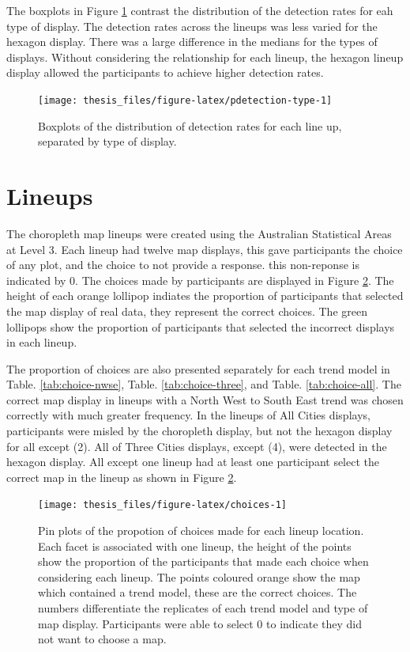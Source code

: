 \documentclass{monashthesis}
\begin{document}
The boxplots in Figure \ref{fig:pdetection-type} contrast the distribution of the detection rates for eah type of display.
The detection rates across the lineups was less varied for the hexagon display. There was a large difference in the medians for the types of displays.
Without considering the relationship for each lineup, the hexagon lineup display allowed the participants to achieve higher detection rates.

\begin{figure}

{\centering \texttt{[image: thesis\_files/figure-latex/pdetection-type-1]} 

}

\caption{Boxplots of the distribution of detection rates for each line up, separated by type of display.}\label{fig:pdetection-type}
\end{figure}

\hypertarget{lineups}{%
\section{Lineups}\label{lineups}}

The choropleth map lineups were created using the Australian Statistical Areas at Level 3. Each lineup had twelve map displays, this gave participants the choice of any plot, and the choice to not provide a response. this non-reponse is indicated by 0.
The choices made by participants are displayed in Figure \ref{fig:choices}. The height of each orange lollipop indiates the proportion of participants that selected the map display of real data, they represent the correct choices.
The green lollipops show the proportion of participants that selected the incorrect displays in each lineup.

The proportion of choices are also presented separately for each trend model in Table. \ref{tab:choice-nwse}, Table. \ref{tab:choice-three}, and Table. \ref{tab:choice-all}.
The correct map display in lineups with a North West to South East trend was chosen correctly with much greater frequency.
In the lineups of All Cities displays, participants were misled by the choropleth display, but not the hexagon display for all except (2).
All of Three Cities displays, except (4), were detected in the hexagon display. All except one lineup had at least one participant select the correct map in the lineup as shown in Figure \ref{fig:choices}.

\begin{figure}

{\centering \texttt{[image: thesis\_files/figure-latex/choices-1]} 

}

\caption{Pin plots of the propotion of choices made for each lineup location. Each facet is associated with one lineup, the height of the points show the proportion of the participants that made each choice when considering each lineup. The points coloured orange show the map which contained a trend model, these are the correct choices. The numbers differentiate the replicates of each trend model and type of map display. Participants were able to select 0 to indicate they did not want to choose a map.}\label{fig:choices}
\end{figure}
\end{document}
